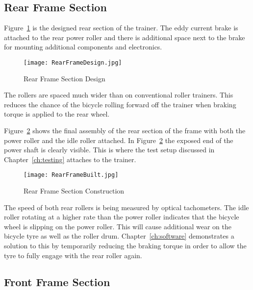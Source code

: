 \vspace*{-0.5cm}

\subsection{Rear Frame Section}

Figure~\ref{fig:RearDesign} is the designed rear section of the trainer. The eddy current brake is attached to the rear power roller and there is additional space next to the brake for mounting additional components and electronics. 

\begin{figure}[H]
	\centering
	\texttt{[image: RearFrameDesign.jpg]}
	\caption{Rear Frame Section Design}
	\label{fig:RearDesign}
\end{figure}

\vspace*{-0.5cm}

The rollers are spaced much wider than on conventional roller trainers. This reduces the chance of the bicycle rolling forward off the trainer when braking torque is applied to the rear wheel.

Figure~\ref{fig:RearBuilt} shows the final assembly of the rear section of the frame with both the power roller and the idle roller attached. In Figure~\ref{fig:RearBuilt} the exposed end of the power shaft is clearly visible. This is where the test setup discussed in Chapter~\ref{ch:testing} attaches to the trainer.

\begin{figure}[H]
	\centering
	\texttt{[image: RearFrameBuilt.jpg]}
	\caption{Rear Frame Section Construction}
	\label{fig:RearBuilt}
\end{figure}

\vspace*{-0.8cm}

The speed of both rear rollers is being measured by optical tachometers. The idle roller rotating at a higher rate than the power roller indicates that the bicycle wheel is slipping on the power roller. This will cause additional wear on the bicycle tyre as well as the roller drum. Chapter~\ref{ch:software} demonstrates a solution to this by temporarily reducing the braking torque in order to allow the tyre to fully engage with the rear roller again. 

\vspace*{-0.3cm}

\subsection{Front Frame Section}

